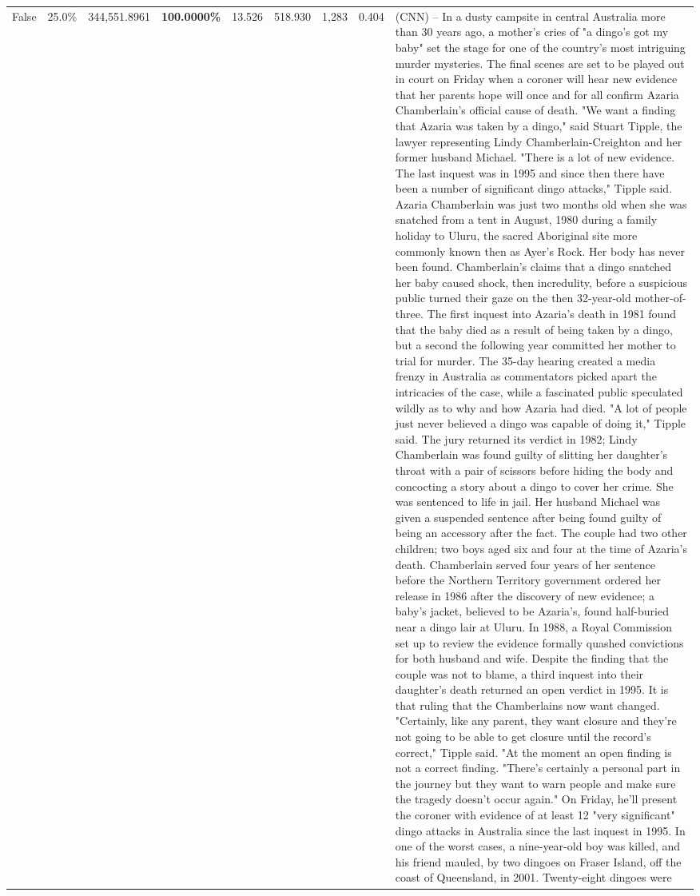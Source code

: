 \begin{table}[H]
\begin{tabular}{lllrlllll}
False & 25.0\% & 344,551.8961 & \bfseries \color{red} 100.0000\% & 13.526 & 518.930 & 1,283 & 0.404 & (CNN) -- In a dusty campsite in central Australia more than 30 years ago, a mother's cries of "a dingo's got my baby" set the stage for one of the country's most intriguing murder mysteries. The final scenes are set to be played out in court on Friday when a coroner will hear new evidence that her parents hope will once and for all confirm Azaria Chamberlain's official cause of death. "We want a finding that Azaria was taken by a dingo," said Stuart Tipple, the lawyer representing Lindy Chamberlain-Creighton and her former husband Michael. "There is a lot of new evidence. The last inquest was in 1995 and since then there have been a number of significant dingo attacks," Tipple said. Azaria Chamberlain was just two months old when she was snatched from a tent in August, 1980 during a family holiday to Uluru, the sacred Aboriginal site more commonly known then as Ayer's Rock. Her body has never been found. Chamberlain's claims that a dingo snatched her baby caused shock, then incredulity, before a suspicious public turned their gaze on the then 32-year-old mother-of-three. The first inquest into Azaria's death in 1981 found that the baby died as a result of being taken by a dingo, but a second the following year committed her mother to trial for murder. The 35-day hearing created a media frenzy in Australia as commentators picked apart the intricacies of the case, while a fascinated public speculated wildly as to why and how Azaria had died. "A lot of people just never believed a dingo was capable of doing it," Tipple said. The jury returned its verdict in 1982; Lindy Chamberlain was found guilty of slitting her daughter's throat with a pair of scissors before hiding the body and concocting a story about a dingo to cover her crime. She was sentenced to life in jail. Her husband Michael was given a suspended sentence after being found guilty of being an accessory after the fact. The couple had two other children; two boys aged six and four at the time of Azaria's death. Chamberlain served four years of her sentence before the Northern Territory government ordered her release in 1986 after the discovery of new evidence; a baby's jacket, believed to be Azaria's, found half-buried near a dingo lair at Uluru. In 1988, a Royal Commission set up to review the evidence formally quashed convictions for both husband and wife. Despite the finding that the couple was not to blame, a third inquest into their daughter's death returned an open verdict in 1995. It is that ruling that the Chamberlains now want changed. "Certainly, like any parent, they want closure and they're not going to be able to get closure until the record's correct," Tipple said. "At the moment an open finding is not a correct finding. "There's certainly a personal part in the journey but they want to warn people and make sure the tragedy doesn't occur again." On Friday, he'll present the coroner with evidence of at least 12 "very significant" dingo attacks in Australia since the last inquest in 1995. In one of the worst cases, a nine-year-old boy was killed, and his friend mauled, by two dingoes on Fraser Island, off the coast of Queensland, in 2001. Twenty-eight dingoes were 
\end{tabular}
\end{table}
